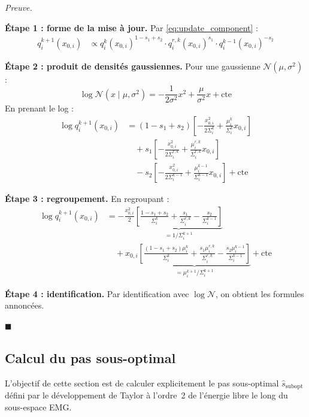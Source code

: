 \documentclass[12pt]{article}
\renewcommand{\qedsymbol}{$\blacksquare$}
\renewenvironment{proof}[1][\proofname]{%
  \par\medskip\noindent
  \textit{\color{proofgray}#1.}\enspace\ignorespaces
}{\hfill\qedsymbol\par\medskip}
\renewcommand{\proofname}{Preuve}
\begin{document}
\begin{proof}

\textbf{Étape 1 : forme de la mise à jour.} Par \eqref{eq:update_component} :
\begin{align}
    q_i^{k+1}(x_{0,i}) &\propto q_i^k(x_{0,i})^{1-s_1+s_2} \cdot q_i^{r,k}(x_{0,i})^{s_1} \cdot q_i^{k-1}(x_{0,i})^{-s_2}
\end{align}

\textbf{Étape 2 : produit de densités gaussiennes.} Pour une gaussienne $\mathcal{N}(\mu, \sigma^2)$ :
\[
\log \mathcal{N}(x \mid \mu, \sigma^2) = -\frac{1}{2\sigma^2}x^2 + \frac{\mu}{\sigma^2}x + \mathrm{cte}
\]
En prenant le log :
\begin{align}
    \log q_i^{k+1}(x_{0,i}) &= (1-s_1+s_2)\left[-\frac{x_{0,i}^2}{2\Sigma_i^{k}} + \frac{\mu_i^k}{\Sigma_i^{k}}x_{0,i}\right] \nonumber\\[4pt]
    &\quad + s_1\left[-\frac{x_{0,i}^2}{2\Sigma_i^{r,k}} + \frac{\mu_i^{r,k}}{\Sigma_i^{r,k}}x_{0,i}\right] \nonumber\\[4pt]
    &\quad - s_2\left[-\frac{x_{0,i}^2}{2\Sigma_i^{k-1}} + \frac{\mu_i^{k-1}}{\Sigma_i^{k-1}}x_{0,i}\right] + \mathrm{cte}
\end{align}

\textbf{Étape 3 : regroupement.} En regroupant :
\begin{align}
    \log q_i^{k+1}(x_{0,i}) &= -\frac{x_{0,i}^2}{2}\underbrace{\left[\frac{1-s_1+s_2}{\Sigma_i^{k}} + \frac{s_1}{\Sigma_i^{r,k}} - \frac{s_2}{\Sigma_i^{k-1}}\right]}_{= 1/\Sigma_i^{k+1}} \nonumber\\[4pt]
    &\quad + x_{0,i}\underbrace{\left[\frac{(1-s_1+s_2)\mu_i^k}{\Sigma_i^{k}} + \frac{s_1\mu_i^{r,k}}{\Sigma_i^{r,k}} - \frac{s_2\mu_i^{k-1}}{\Sigma_i^{k-1}}\right]}_{= \mu_i^{k+1}/\Sigma_i^{k+1}} + \mathrm{cte}
\end{align} 

\textbf{Étape 4 : identification.} Par identification avec $\log \mathcal{N}$, on obtient les formules annoncées.

\end{proof}







\subsection{Calcul du pas sous-optimal}

L'objectif de cette section est de calculer explicitement le pas sous-optimal $\hat{s}_{\mathrm{subopt}}$ défini par le développement de Taylor à l'ordre~2 de l'énergie libre le long du sous-espace EMG.
\end{document}
